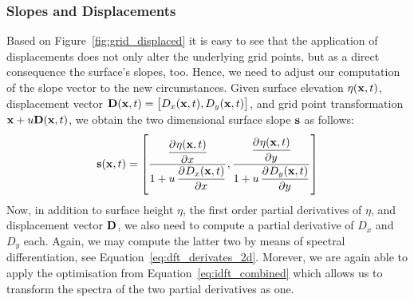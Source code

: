 \subsubsection{Slopes and Displacements}
%
Based on Figure~\ref{fig:grid_displaced} it is easy to see that the application 
of displacements does not only alter the underlying grid points, but as a 
direct consequence the surface's slopes, too. Hence, we need to adjust our 
computation of the slope vector to the new circumstances. Given surface 
elevation $\eta(\mathbf{x},t)$, displacement vector $\mathbf{D}(\mathbf{x},t) = 
\left[D_x(\mathbf{x},t), D_y(\mathbf{x},t)\right]$, and grid point transformation 
$\mathbf{x} + u\mathbf{D}(\mathbf{x},t)$, we obtain the two dimensional surface slope
$\mathbf{s}$ as follows:
\begin{equation}
\mvec{s}(\mvec{x},t) = \left[\frac{\dpd{\eta(\mvec{x},t)}{x}}{1 + u 
\dpd{D_x(\mvec{x},t)}{x}}, \frac{\dpd{\eta(\mvec{x},t)}{y}}{1 + u 
\dpd{D_y(\mvec{x},t)}{y}}\right]
\end{equation}
Now, in addition to surface height $\eta$, the first order partial derivatives 
of $\eta$, and displacement vector $\mathbf{D}$, we also need to compute a
partial derivative of $D_x$ and $D_y$ each. Again, we may compute the latter 
two by means of spectral differentiation, see 
Equation~\ref{eq:dft_derivates_2d}. Morever, we are again able to apply the 
optimisation from Equation~\ref{eq:idft_combined} which allows us to transform 
the spectra of the two partial derivatives as one.
%
